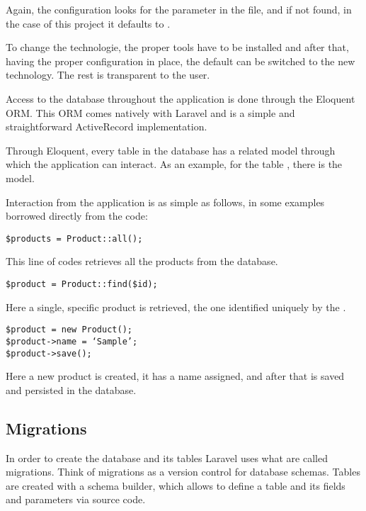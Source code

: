 Again, the configuration looks for the  parameter in the  file, and if not found, in the case of this project it defaults to .

To change the technologie, the proper tools have to be installed and after that, having the proper configuration in place, the default can be switched to the new technology. The rest is transparent to the user.

Access to the database throughout the application is done through the Eloquent ORM. This ORM comes natively with Laravel and is a simple and straightforward ActiveRecord implementation.

Through Eloquent, every table in the database has a related model through which the application can interact. As an example, for the table , there is the  model.

Interaction from the application is as simple as follows, in some examples borrowed directly from the code:

\begin{verbatim}
$products = Product::all();
\end{verbatim}

This line of codes retrieves all the products from the database.

\begin{verbatim}
$product = Product::find($id);
\end{verbatim}

Here a single, specific product is retrieved, the one identified uniquely by the .

\begin{verbatim}
$product = new Product();
$product->name = ‘Sample’;
$product->save();
\end{verbatim}

Here a new product is created, it has a name assigned, and after that is saved and persisted in the database.

\subsection{Migrations}
In order to create the database and its tables Laravel uses what are called migrations. Think of migrations as a version control for database schemas. Tables are created with a schema builder, which allows to define a table and its fields and parameters via source code.

